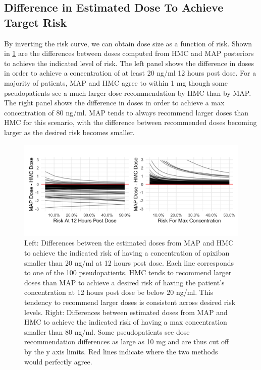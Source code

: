 \subsection*{Difference in Estimated Dose To Achieve Target Risk}


By inverting the risk curve, we can obtain dose size as a function of risk.  Shown in \cref{fig:fig7} are the differences between doses computed from HMC and MAP posteriors to achieve the indicated level of risk.  The left panel shows the difference in doses in order to achieve a concentration of at least 20 ng/ml 12 hours post dose. For a majority of patients, MAP and HMC agree to within 1 mg though some pseudopatients see a much larger dose recommendation by HMC than by MAP.  The right panel shows the difference in doses in order to achieve a max concentration of 80 ng/ml.  MAP tends to always recommend larger doses than HMC for this scenario, with the difference between recommended doses becoming larger as the desired risk becomes smaller.

\begin{figure}[h!]
	\centering
	\includegraphics[width=\linewidth]{figs/experiments}
	\caption{Left: Differences between the estimated doses from MAP and HMC to achieve the indicated risk of having a concentration of apixiban smaller than 20 ng/ml at 12 hours post dose. Each line corresponds to one of the 100 pseudopatients. HMC tends to recommend larger doses than MAP to achieve a desired risk of having the patient's concentration at 12 hours post dose be below 20 ng/ml. This tendency to recommend larger doses is consistent across desired risk levels.  Right: Differences between estimated doses from MAP and HMC to achieve the indicated risk of having a max concentration smaller than 80 ng/ml.  Some pseudopatients see dose recommendation differences as large as 10 mg and are thus cut off by the y axis limits. Red lines indicate where the two methods would perfectly agree.}
	\label{fig:fig7}
\end{figure}


